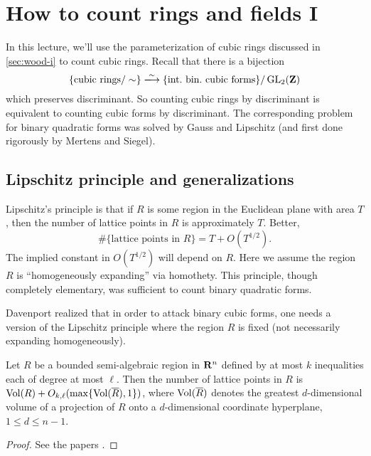 
\section{How to count rings and fields I}\label{sec:bhargava-ii}





In this lecture, we'll use the parameterization of cubic rings discussed in 
\autoref{sec:wood-i} to count cubic rings. Recall that there is a bijection 
\[
  \{\text{cubic rings}/\sim\} \iso \{\text{int.~bin.~cubic forms}\} /\generallinear_2(\dZ) 
\]
which preserves discriminant. So counting cubic rings by discriminant is 
equivalent to counting cubic forms by discriminant. The corresponding problem 
for binary quadratic forms was solved by Gauss and Lipschitz (and first done 
rigorously by Mertens and Siegel). 





\subsection{Lipschitz principle and generalizations}

Lipschitz's principle is that if $R$ is some region in the Euclidean plane with 
area $T$, then the number of lattice points in $R$ is approximately $T$. 
Better, 
\[
  \# \{\text{lattice points in }R\} = T + O(T^{1/2}) .
\]
The implied constant in $O(T^{1/2})$ will depend on $R$. Here we assume the 
region $R$ is ``homogeneously expanding'' via homothety. This principle, though 
completely elementary, was sufficient to count binary quadratic forms. 

Davenport realized that in order to attack binary cubic forms, one needs a 
version of the Lipschitz principle where the region $R$ is fixed (not 
necessarily expanding homogeneously). 

\begin{theo}[Davenport] 
Let $R$ be a bounded semi-algebraic region in $\mathbf{R}^n$ defined by at most $k$ 
inequalities each of degree at most $\ell$. Then the number of lattice points 
in $R$ is $\operatorname{Vol}(R)+O_{k,\ell}(\max\{\operatorname{Vol}(\overline R),1\})$, where 
$\operatorname{Vol}(\overline R)$ denotes the greatest $d$-dimensional volume of a 
projection of $R$ onto a $d$-dimensional coordinate hyperplane, 
$1\leqslant d\leqslant n-1$. 
\end{theo}
\begin{proof}
See the papers \cite{d51,d64}. 
\end{proof}

